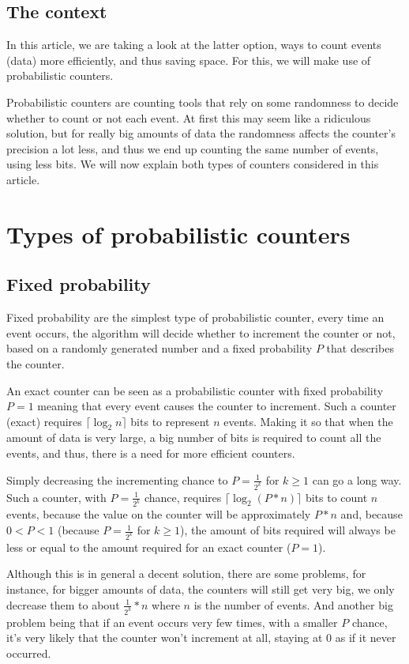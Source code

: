 \documentclass[...]{revdetua}
\begin{document}
\subsection{The context}
In this article, we are taking a look at the latter option, ways to count events (data) more efficiently, and thus saving space.
For this, we will make use of probabilistic counters.\par
Probabilistic counters are counting tools that rely on some randomness to decide whether to count  or not each event. At first this may seem like a ridiculous solution, but for really big amounts of data the randomness affects the counter's precision a lot less, and thus we end up counting the same number of events, using less bits.
We will now explain both types of counters considered in this article. 
\section{Types of probabilistic counters}
\subsection{Fixed probability}
Fixed probability are the simplest type of probabilistic counter, every time an event occurs, the algorithm will decide whether to increment the counter or not, based on a randomly generated number and a fixed probability $P$ that describes the counter.\par
An exact counter can be seen as a probabilistic counter with fixed probability $P=1$ meaning that every event causes the counter to increment. Such a counter (exact) requires $\lceil \log_2 n \rceil$ bits to represent $n$ events. Making it so that when the amount of data is very large, a big number of bits is required to count all the events, and thus, there is a need for more efficient counters.\par
Simply decreasing the incrementing chance to  $P=\frac{1}{2^k}$ for $k \geq 1$ can go a long way.
Such a counter, with $P=\frac{1}{2^k}$ chance, requires $\lceil \log_2 (P*n) \rceil$ bits to count $n$ events, because the value on the counter will be approximately $P*n$ and, because $0<P<1$ (because $P=\frac{1}{2^k}$ for $k \geq 1$), the amount of bits required will always be less or equal to the amount required for an exact counter ($P=1$).\par 
Although this is in general a decent solution, there are some problems, for instance, for bigger amounts of data, the counters will still get very big, we only decrease them to about $\frac{1}{2^k}*n$ where $n$ is the number of events. And another big problem being that if an event occurs very few times, with a smaller $P$ chance, it's very likely that the counter won't increment at all, staying at $0$ as if it never occurred.
\end{document}
